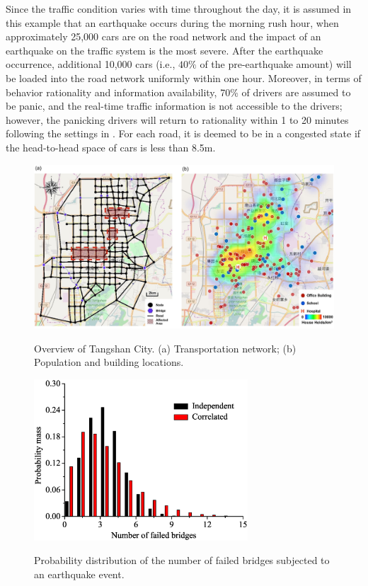 \documentclass[review,11pt,nonatbib]{elsarticle}
\begin{document}
\par Since the traffic condition varies with time throughout the day, it is assumed in this example that an earthquake occurs during the morning rush hour, when approximately 25,000 cars are on the road network and the impact of an earthquake on the traffic system is the most severe. After the earthquake occurrence, additional 10,000 cars (i.e., $40\%$ of the pre-earthquake amount) will be loaded into the road network uniformly within one hour. Moreover, in terms of behavior rationality and information availability,  70\% of drivers are assumed to be panic, and the real-time traffic information is not accessible to the drivers; however, the panicking drivers will return to rationality within 1 to 20 minutes following the settings in \citep{feng2017post}. For each road, it is deemed to be in a congested state if the head-to-head space of cars is less than 8.5m.  

\begin{figure}[!htp]\center
\includegraphics[width=12cm]{fig1.pdf}\\
\caption{Overview of Tangshan City. (a) Transportation network; (b) Population and building locations.}\label{fig1}
\end{figure}

\begin{figure}[!htp]\center
\includegraphics[width=8cm]{fig2.eps}\\
\caption{Probability distribution of the number of failed bridges subjected to an earthquake event.}\label{fig2}
\end{figure}
\end{document}
